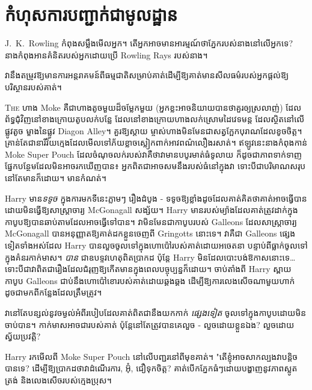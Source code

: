 \chapter{កំហុសការបញ្ជាក់ជាមូលដ្ឋាន}

\begin{chapterOpeningAuthorNote}
J.~K.~Rowling កំពុងសម្លឹងមើលអ្នក។ តើអ្នកអាចមានអារម្មណ៍ថាភ្នែករបស់នាងនៅលើអ្នកទេ? នាងកំពុងអានគំនិតរបស់អ្នកដោយប្រើ Rowling Rays របស់នាង។
\end{chapterOpeningAuthorNote}
\begin{chapterOpeningQuote}
វានឹងតម្រូវឱ្យមានការអន្តរាគមន៍ពីធម្មជាតិសម្រាប់គាត់ដើម្បីឱ្យគាត់មានសីលធម៌របស់អ្នកផ្តល់ឱ្យបរិស្ថានរបស់គាត់។
\end{chapterOpeningQuote}

\lettrine{T}{he} ហាង Moke គឺជាហាងតូចមួយដ៏ចម្លែកមួយ (អ្នកខ្លះអាចនិយាយបានថាគួរឲ្យស្រលាញ់) ដែលព័ទ្ធជុំវិញនៅខាងក្រោយតូបលក់បន្លែ ដែលនៅខាងក្រោយហាងលក់ស្រោមដៃវេទមន្ត ដែលស្ថិតនៅលើផ្លូវតូច ម្ខាងនៃផ្លូវ Diagon Alley។ គួរឱ្យស្តាយ ម្ចាស់ហាងមិនមែនជាសត្វក្អែកបុរាណដែលខូចចិត្ត។ គ្រាន់​តែ​ជា​នារី​វ័យ​ក្មេង​ដែល​មើល​ទៅ​ភ័យ​ខ្លាច​ស្លៀក​ពាក់​អាវ​ពណ៌​លឿង​រសាត់។ ឥឡូវនេះនាងកំពុងកាន់ Moke Super Pouch  ដែលចំណុចលក់របស់វាគឺថាវាមានបបូរមាត់ធំទូលាយ ក៏ដូចជាភាពទាក់ទាញផ្នែកបន្ថែមដែលមិនអាចរកឃើញបាន៖ អ្នកពិតជាអាចសមនឹងរបស់ធំនៅក្នុងវា ទោះបីជាបរិមាណសរុបនៅតែមានក៏ដោយ។ មានកំណត់។

Harry មាន\emph{ទទូច} ក្នុងការមកទីនេះភ្លាមៗ រឿងដំបូង - ទទូចឱ្យខ្លាំងដូចដែលគាត់គិតថាគាត់អាចធ្វើបានដោយមិនធ្វើឱ្យសាស្រ្តាចារ្យ McGonagall សង្ស័យ។ Harry មានរបស់ម្យ៉ាងដែលគាត់ត្រូវដាក់ក្នុងកាបូបឱ្យបានឆាប់តាមដែលអាចធ្វើទៅបាន។ វាមិនមែនជាកាបូបរបស់ Galleons ដែលសាស្រ្តាចារ្យ McGonagall បានអនុញ្ញាតឱ្យគាត់ដកខ្លួនចេញពី Gringotts នោះទេ។ វាគឺជា Galleons ផ្សេងទៀតទាំងអស់ដែល Harry បានលួចចូលទៅក្នុងហោប៉ៅរបស់គាត់ដោយអចេតនា បន្ទាប់ពីធ្លាក់ចូលទៅក្នុងគំនរកាក់មាស។ \emph{បាន} ជាឧបទ្ទវហេតុពិតប្រាកដ ប៉ុន្តែ Harry មិនដែលបោះបង់ឱកាសនោះទេ… ទោះបីជាវាពិតជារឿងដែលជំរុញឱ្យកើតមានក្នុងពេលបច្ចុប្បន្នក៏ដោយ។ ចាប់តាំងពី Harry ស្ពាយកាបូប Galleons ជាប់នឹងហោប៉ៅខោរបស់គាត់ដោយឆ្គងឆ្គង ដើម្បីឱ្យការលេងសើចណាមួយហាក់ដូចជាមកពីកន្លែងដែលត្រឹមត្រូវ។

វានៅតែបន្សល់នូវចម្ងល់អំពីរបៀបដែលគាត់ពិតជានឹងយកកាក់ \emph{ ផ្សេងទៀត} ចូលទៅក្នុងកាបូបដោយមិនចាប់បាន។ កាក់មាសអាចជារបស់គាត់ ប៉ុន្តែនៅតែត្រូវបានគេលួច - លួចដោយខ្លួនឯង? លួចដោយស្វ័យប្រវត្តិ?

Harry រកមើលពី Moke Super Pouch  នៅលើបញ្ជរនៅពីមុខគាត់។ "តើខ្ញុំអាចសាកល្បងវាបន្តិចបានទេ? ដើម្បី​ឱ្យ​ប្រាកដ​ថា​វា​ដំណើរ​ការ​, អ៊ុំ, ជឿ​ទុក​ចិត្ត​? គាត់បើកភ្នែកធំៗដោយបង្ហាញនូវភាពស្លូតត្រង់ និងលេងសើចរបស់ក្មេងប្រុស។

